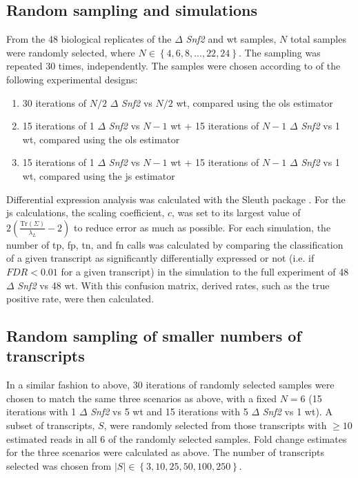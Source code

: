 \subsection{Random sampling and simulations}

From the 48 biological replicates of the $\Delta$ \emph{Snf2} and \gls{wt} samples, $N$ total samples were randomly selected, where $N \in \left\{4, 6, 8, ..., 22, 24 \right\}$.
The sampling was repeated 30 times, independently.
The samples were chosen according to of the following experimental designs:

\begin{enumerate}
  \item 30 iterations of $N/2$ $\Delta$ \emph{Snf2} vs $N/2$ \gls{wt}, compared using the \gls{ols} estimator
  \item 15 iterations of 1 $\Delta$ \emph{Snf2} vs $N - 1$ \gls{wt} + 15 iterations of $N - 1$ $\Delta$ \emph{Snf2} vs 1 \gls{wt}, compared using the \gls{ols} estimator
  \item 15 iterations of 1 $\Delta$ \emph{Snf2} vs $N - 1$ \gls{wt} + 15 iterations of $N - 1$ $\Delta$ \emph{Snf2} vs 1 \gls{wt}, compared using the \gls{js} estimator
\end{enumerate}

Differential expression analysis was calculated with the Sleuth package \cite{pimentelDifferentialAnalysisRNAseq2017,yiGenelevelDifferentialAnalysis2018}.
For the \gls{js} calculations, the scaling coefficient, $c$, was set to its largest value of $2 \left( \frac{ \text{Tr} (\Sigma) }{\lambda_L} - 2 \right)$ to reduce error as much as possible.
For each simulation, the number of \gls{tp}, \gls{fp}, \gls{tn}, and \gls{fn} calls was calculated by comparing the classification of a given transcript as significantly differentially expressed or not (i.e. if $FDR < 0.01$ for a given transcript) in the simulation to the full experiment of 48 $\Delta$ \emph{Snf2} vs 48 \gls{wt}.
With this confusion matrix, derived rates, such as the true positive rate, were then calculated.

\subsection{Random sampling of smaller numbers of transcripts}

In a similar fashion to above, 30 iterations of randomly selected samples were chosen to match the same three scenarios as above, with a fixed $N = 6$ (15 iterations with 1 $\Delta$ \emph{Snf2} vs 5 \gls{wt} and 15 iterations with 5 $\Delta$ \emph{Snf2} vs 1 \gls{wt}).
A subset of transcripts, $S$, were randomly selected from those transcripts with $\ge 10$ estimated reads in all 6 of the randomly selected samples.
Fold change estimates for the three scenarios were calculated as above.
The number of transcripts selected was chosen from $|S| \in \left\{3, 10, 25, 50, 100, 250 \right\}$.

